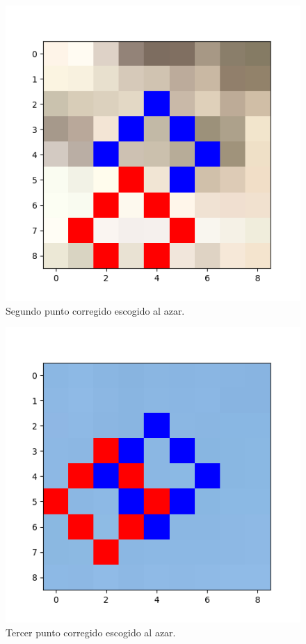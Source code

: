 \documentclass[12pt, spanish]{article}
\begin{document}
\begin{figure}[H]
  \centering
      \includegraphics[width=\textwidth]{cmp_p2.png}
 		\caption{Segundo punto corregido escogido al azar.}
\end{figure}

\begin{figure}[H]
  \centering
      \includegraphics[width=\textwidth]{cmp_p3.png}
 		\caption{Tercer punto corregido escogido al azar.}
\end{figure}
\end{document}
